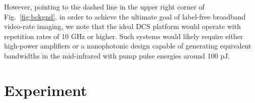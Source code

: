 \documentclass{optica-article}
\begin{document}

However, pointing to the dashed line in the upper right corner of \mbox{Fig. \ref{fig:bckgnd}}, in order to achieve the ultimate goal of label-free broadband video-rate imaging, we note that the ideal DCS platform would operate with repetition rates of 10 GHz or higher. Such systems would likely require either high-power amplifiers or a nanophotonic design capable of generating equivalent bandwidths in the mid-infrared with pump pulse energies around 100 pJ.





\section{Experiment}

\end{document}
